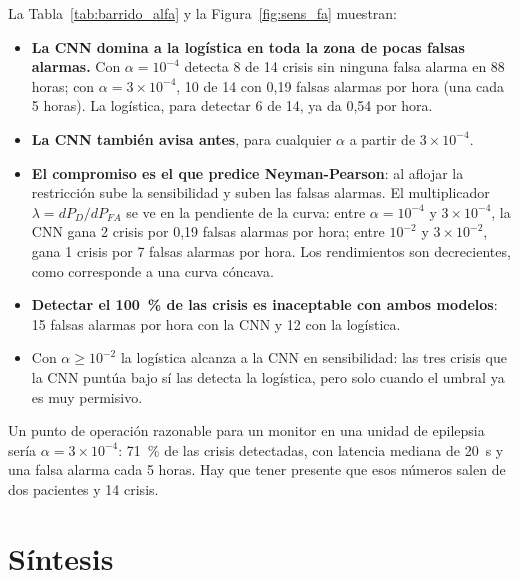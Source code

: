 La Tabla~\ref{tab:barrido_alfa} y la Figura~\ref{fig:sens_fa} muestran:
\begin{itemize}
  \item \textbf{La CNN domina a la logística en toda la zona de pocas falsas alarmas.} Con $\alpha = 10^{-4}$ detecta 8 de 14
        crisis sin ninguna falsa alarma en 88 horas; con $\alpha = 3\times10^{-4}$, 10 de 14 con 0,19 falsas alarmas por hora
        (una cada 5 horas). La logística, para detectar 6 de 14, ya da 0,54 por hora.
  \item \textbf{La CNN también avisa antes}, para cualquier $\alpha$ a partir de $3\times10^{-4}$.
  \item \textbf{El compromiso es el que predice Neyman-Pearson}: al aflojar la restricción sube la sensibilidad y suben las
        falsas alarmas. El multiplicador $\lambda = dP_D/dP_{FA}$ se ve en la pendiente de la curva: entre $\alpha = 10^{-4}$ y
        $3\times10^{-4}$, la CNN gana 2 crisis por 0,19 falsas alarmas por hora; entre $10^{-2}$ y $3\times10^{-2}$, gana 1 crisis
        por 7 falsas alarmas por hora. Los rendimientos son decrecientes, como corresponde a una curva cóncava.
  \item \textbf{Detectar el 100~\% de las crisis es inaceptable con ambos modelos}: 15 falsas alarmas por hora con la CNN y 12
        con la logística.
  \item Con $\alpha \ge 10^{-2}$ la logística alcanza a la CNN en sensibilidad: las tres crisis que la CNN puntúa bajo sí las
        detecta la logística, pero solo cuando el umbral ya es muy permisivo.
\end{itemize}

Un punto de operación razonable para un monitor en una unidad de epilepsia sería $\alpha = 3\times10^{-4}$: 71~\% de las crisis
detectadas, con latencia mediana de 20~s y una falsa alarma cada 5 horas. Hay que tener presente que esos números salen de dos
pacientes y 14 crisis.

\section{Síntesis}
\label{sec:res_sintesis}

